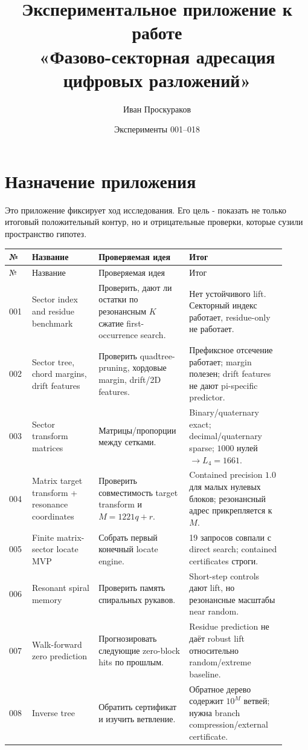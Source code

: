 \documentclass[11pt,a4paper]{article}
\title{Экспериментальное приложение к работе\\«Фазово-секторная адресация цифровых разложений»}
\author{Иван Проскураков}
\date{Эксперименты 001--018}
\begin{document}
\maketitle

\section*{Назначение приложения}
Это приложение фиксирует ход исследования.  Его цель - показать не только итоговый положительный контур, но и отрицательные проверки, которые сузили пространство гипотез.

\begin{longtable}{p{0.07\linewidth}p{0.22\linewidth}p{0.30\linewidth}p{0.32\linewidth}}
\toprule
№ & Название & Проверяемая идея & Итог \\
\midrule
\endfirsthead
\toprule
№ & Название & Проверяемая идея & Итог \\
\midrule
\endhead
001 & Sector index and residue benchmark & Проверить, дают ли остатки по резонансным $K$ сжатие first-occurrence search. & Нет устойчивого lift. Секторный индекс работает, residue-only не работает. \\
002 & Sector tree, chord margins, drift features & Проверить quadtree-pruning, хордовые margin, drift/2D features. & Префиксное отсечение работает; margin полезен; drift features не дают pi-specific predictor. \\
003 & Sector transform matrices & Матрицы/пропорции между сетками. & Binary/quaternary exact; decimal/quaternary sparse; $1000$ нулей $\to L_4=1661$. \\
004 & Matrix target transform + resonance coordinates & Проверить совместимость target transform и $M=1221q+r$. & Contained precision $1.0$ для малых нулевых блоков; резонансный адрес прикрепляется к $M$. \\
005 & Finite matrix-sector locate MVP & Собрать первый конечный locate engine. & 19 запросов совпали с direct search; contained certificates строги. \\
006 & Resonant spiral memory & Проверить память спиральных рукавов. & Short-step controls дают lift, но резонансные масштабы near random. \\
007 & Walk-forward zero prediction & Прогнозировать следующие zero-block hits по прошлым. & Residue prediction не даёт robust lift относительно random/extreme baseline. \\
008 & Inverse tree & Обратить сертификат и изучить ветвление. & Обратное дерево содержит $10^M$ ветвей; нужна branch compression/external certificate. \\

\end{longtable}
\end{document}
